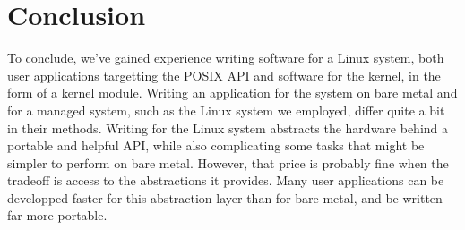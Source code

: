 \chapter{Conclusion}

To conclude, we've gained experience writing software for a Linux system, both
user applications targetting the POSIX API and software for the kernel, in the
form of a kernel module. Writing an application for the system on bare metal and
for a managed system, such as the Linux system we employed, differ quite a bit
in their methods. Writing for the Linux system abstracts the hardware behind a
portable and helpful API, while also complicating some tasks that might be
simpler to perform on bare metal. However, that price is probably fine when the
tradeoff is access to the abstractions it provides. Many user applications can
be developped faster for this abstraction layer than for bare metal, and be
written far more portable.
